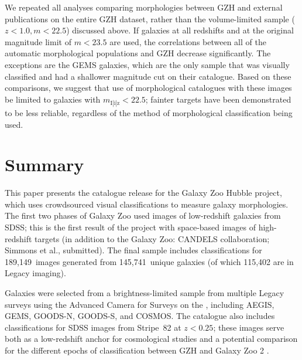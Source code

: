 \documentclass[a4paper,fleqn,usenatbib]{mnras}
\begin{document}
We repeated all analyses comparing morphologies between GZH and external
publications on the entire GZH dataset, rather than the volume-limited sample
($z<1.0,m<22.5$) discussed above. If galaxies at all redshifts and at the
original magnitude limit of $m<23.5$ are used, the correlations between all of
the automatic morphological populations and GZH decrease significantly.  The
exceptions are the GEMS galaxies, which are the only sample that was visually
classified and had a shallower magnitude cut on their catalogue.  Based on
these comparisons, we suggest that use of morphological catalogues with these
\hst{} images be limited to galaxies with $m_\mathrm{I|i|z}<22.5$; fainter
targets have been demonstrated to be less reliable, regardless of the method of
morphological classification being used.

\section{Summary}\label{sec:summary}


This paper presents the catalogue release for the Galaxy Zoo Hubble project,
which uses crowdsourced visual classifications to measure galaxy morphologies.
The first two phases of Galaxy Zoo \citep{lin11,wil13} used images of
low-redshift galaxies from SDSS; this is the first result of the project with
space-based images of high-redshift targets (in addition to the Galaxy Zoo:
CANDELS collaboration; Simmons et al., submitted). The final sample includes
classifications for 189,149~images generated from 145,741~unique galaxies
(of which 115,402 are in \hst{} Legacy imaging).

Galaxies were selected from a brightness-limited sample from multiple Legacy
surveys using the Advanced Camera for Surveys on the \hubble,
including AEGIS, GEMS, GOODS-N, GOODS-S, and COSMOS. The catalogue also includes
classifications for SDSS images from Stripe~82 at $z<0.25$; these images
serve both as a low-redshift anchor for
cosmological studies and a potential comparison for the different epochs of
classification between GZH and Galaxy Zoo 2 \citep{wil13}. 
\end{document}
